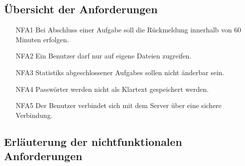\documentclass[a4paper,12pt]{article}
\begin{document}
\subsection{Übersicht der Anforderungen}
\begin{itemize}[nosep]
\leftskip=0.5cm

	\item[NFA1] \hspace{\parindent} Bei Abschluss einer \gls{Aufgabe} soll die Rückmeldung innerhalb von 60 Minuten erfolgen.
	
	\item[NFA2] \hspace{\parindent} Ein \gls{Benutzer} darf nur auf eigene Dateien zugreifen.
	
	\item[NFA3] \hspace{\parindent} \glspl{Statistik} abgeschlossener \glspl{Aufgabe} sollen nicht änderbar sein.
	
	\item[NFA4] \hspace{\parindent} Passwörter werden nicht als Klartext gespeichert werden.
	
	\item[NFA5] \hspace{\parindent} Der \gls{Benutzer} verbindet sich mit dem \gls{Server} über eine sichere Verbindung.
\end{itemize}
\subsection{Erläuterung der nichtfunktionalen Anforderungen}
\end{document}

